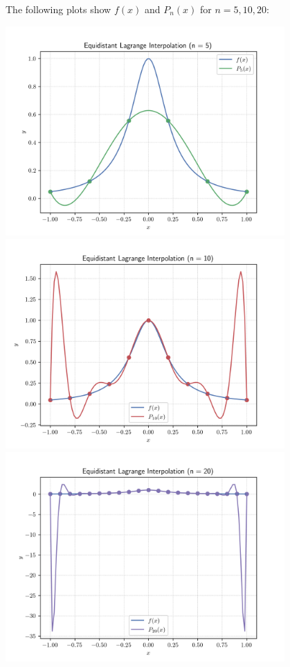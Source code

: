 \documentclass[12pt]{article}
\begin{document}
\newpage
The following plots show $f(x)$ and $P_n(x)$ for $n=5, 10, 20$:
\begin{center}
    \includegraphics[width=0.8\textwidth]{../plots_2/q2_2/p5.png}
    \includegraphics[width=0.8\textwidth]{../plots_2/q2_2/p10.png}
    \includegraphics[width=0.8\textwidth]{../plots_2/q2_2/p20.png}

\end{center}
\end{document}
